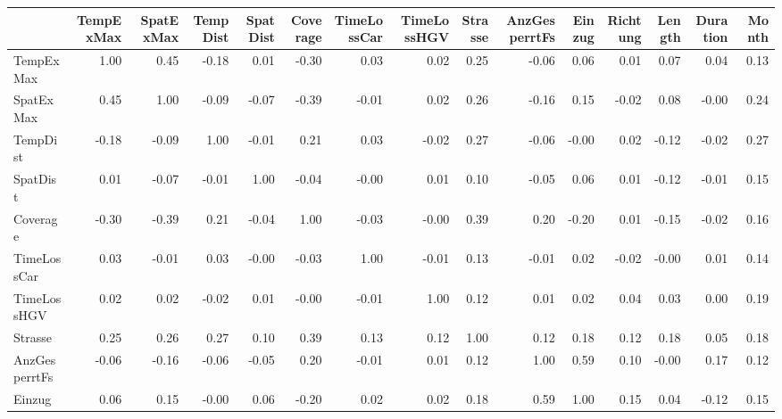 \begin{tabular}{lrrrrrrrrrrrrrr}
\toprule
{} &  TempExMax &  SpatExMax &  TempDist &  SpatDist &  Coverage &  TimeLossCar &  TimeLossHGV &  Strasse &  AnzGesperrtFs &  Einzug &  Richtung &  Length &  Duration &  Month \\
\midrule
TempExMax     &       1.00 &       0.45 &     -0.18 &      0.01 &     -0.30 &         0.03 &         0.02 &     0.25 &          -0.06 &    0.06 &      0.01 &    0.07 &      0.04 &   0.13 \\
SpatExMax     &       0.45 &       1.00 &     -0.09 &     -0.07 &     -0.39 &        -0.01 &         0.02 &     0.26 &          -0.16 &    0.15 &     -0.02 &    0.08 &     -0.00 &   0.24 \\
TempDist      &      -0.18 &      -0.09 &      1.00 &     -0.01 &      0.21 &         0.03 &        -0.02 &     0.27 &          -0.06 &   -0.00 &      0.02 &   -0.12 &     -0.02 &   0.27 \\
SpatDist      &       0.01 &      -0.07 &     -0.01 &      1.00 &     -0.04 &        -0.00 &         0.01 &     0.10 &          -0.05 &    0.06 &      0.01 &   -0.12 &     -0.01 &   0.15 \\
Coverage      &      -0.30 &      -0.39 &      0.21 &     -0.04 &      1.00 &        -0.03 &        -0.00 &     0.39 &           0.20 &   -0.20 &      0.01 &   -0.15 &     -0.02 &   0.16 \\
TimeLossCar   &       0.03 &      -0.01 &      0.03 &     -0.00 &     -0.03 &         1.00 &        -0.01 &     0.13 &          -0.01 &    0.02 &     -0.02 &   -0.00 &      0.01 &   0.14 \\
TimeLossHGV   &       0.02 &       0.02 &     -0.02 &      0.01 &     -0.00 &        -0.01 &         1.00 &     0.12 &           0.01 &    0.02 &      0.04 &    0.03 &      0.00 &   0.19 \\
Strasse       &       0.25 &       0.26 &      0.27 &      0.10 &      0.39 &         0.13 &         0.12 &     1.00 &           0.12 &    0.18 &      0.12 &    0.18 &      0.05 &   0.18 \\
AnzGesperrtFs &      -0.06 &      -0.16 &     -0.06 &     -0.05 &      0.20 &        -0.01 &         0.01 &     0.12 &           1.00 &    0.59 &      0.10 &   -0.00 &      0.17 &   0.12 \\
Einzug        &       0.06 &       0.15 &     -0.00 &      0.06 &     -0.20 &         0.02 &         0.02 &     0.18 &           0.59 &    1.00 &      0.15 &    0.04 &     -0.12 &   0.15 \\

\end{tabular}
